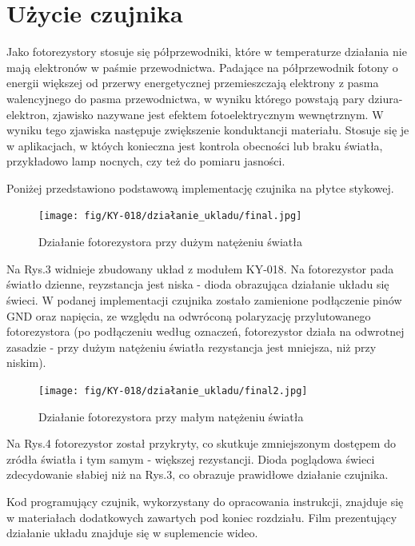 \documentclass[11pt, a4paper]{article}
\begin{document}
\newpage
\section*{Użycie czujnika}
Jako fotorezystory stosuje się półprzewodniki, które w temperaturze działania nie mają elektronów w paśmie przewodnictwa. Padające na półprzewodnik fotony o energii większej od przerwy energetycznej przemieszczają elektrony z pasma walencyjnego do pasma przewodnictwa, w wyniku którego powstają pary dziura-elektron, zjawisko nazywane jest efektem fotoelektrycznym wewnętrznym. W wyniku tego zjawiska następuje zwiększenie konduktancji materiału. Stosuje się je w aplikacjach, w któych konieczna jest kontrola obecności lub braku światła, przykładowo lamp nocnych, czy też do pomiaru jasności. 


Poniżej przedstawiono podstawową implementację czujnika na płytce stykowej.

\vspace{0.5cm}
\begin{figure}[h!]
    \centering
    \texttt{[image: fig/KY-018/działanie\_ukladu/final.jpg]}
    \caption{Działanie fotorezystora przy dużym natężeniu światła}
    \label{fig:my_label}
\end{figure}

Na Rys.3 widnieje zbudowany układ z modułem KY-018. Na fotorezystor pada światło dzienne, reyzstancja jest niska - dioda obrazująca działanie układu się świeci. W podanej implementacji czujnika zostało zamienione podłączenie pinów GND oraz napięcia, ze względu na odwróconą polaryzację przylutowanego fotorezystora (po podłączeniu według oznaczeń, fotorezystor działa na odwrotnej zasadzie - przy dużym natężeniu światła rezystancja jest mniejsza, niż przy niskim). 


\newpage
\begin{figure}[h!]
    \centering
    \texttt{[image: fig/KY-018/działanie\_ukladu/final2.jpg]}
    \caption{Działanie fotorezystora przy małym natężeniu światła}
    \label{fig:my_label}
\end{figure}

Na Rys.4 fotorezystor został przykryty, co skutkuje zmniejszonym dostępem do zródła światła i tym samym - większej rezystancji. Dioda poglądowa świeci zdecydowanie słabiej niż na Rys.3, co obrazuje prawidłowe działanie czujnika.
\newline 



Kod programujący czujnik, wykorzystany do opracowania instrukcji, znajduje się w materiałach dodatkowych zawartych pod koniec rozdziału.
\newline
Film prezentujący działanie układu znajduje się w suplemencie wideo.
\printbibliography[heading=bibintoc]
\end{document}
